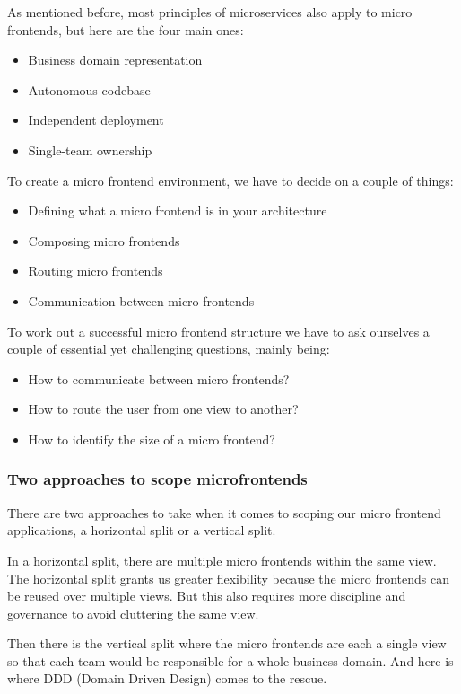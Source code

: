 As mentioned before, most principles of microservices also apply to micro frontends, but here are the four main ones:
\begin{itemize}
    \item Business domain representation
    \item Autonomous codebase 
    \item Independent deployment
    \item Single-team ownership
\end{itemize}

To create a micro frontend environment, we have to decide on a couple of things:
\begin{itemize}
    \item Defining what a micro frontend is in your architecture
    \item Composing micro frontends
    \item Routing micro frontends
    \item Communication between micro frontends
\end{itemize}
To work out a successful micro frontend structure we have to ask ourselves a couple of essential yet challenging questions, mainly being:
\begin{itemize}
    \item How to communicate between micro frontends?
    \item How to route the user from one view to another?
    \item How to identify the size of a micro frontend?
\end{itemize}
\subsubsection{Two approaches to scope microfrontends}
There are two approaches to take when it comes to scoping our micro frontend applications, a horizontal split or a vertical split. 

In a horizontal split, there are multiple micro frontends within the same view. The horizontal split grants us greater flexibility because the micro frontends can be reused over multiple views. But this also requires more discipline and governance to avoid cluttering the same view.

Then there is the vertical split where the micro frontends are each a single view so that each team would be responsible for a whole business domain. And here is where DDD (Domain Driven Design) comes to the rescue.

